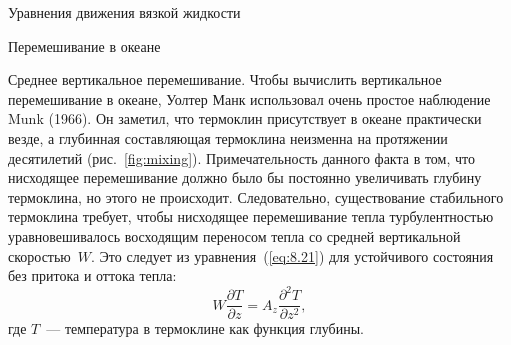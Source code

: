 \begin{chapter}{Уравнения движения вязкой жидкости}
\begin{section}{Перемешивание в океане}
\begin{paragraph}{Среднее вертикальное перемешивание.}
Чтобы вычислить вертикальное перемешивание в океане, Уолтер Манк использовал 
очень простое наблюдение Munk (1966). Он заметил, что 
термоклин присутствует в океане практически везде, 
а глубинная составляющая термоклина неизменна на протяжении
десятилетий (рис.~\ref{fig:mixing}). Примечательность данного факта в том, что
нисходящее перемешивание должно было бы постоянно увеличивать глубину 
термоклина, но этого не происходит. Следовательно, существование стабильного 
термоклина требует, чтобы нисходящее перемешивание тепла 
турбулентностью уравновешивалось восходящим
переносом тепла со средней вертикальной
скоростью~$W$. Это следует из уравнения~(\ref{eq:8.21}) для устойчивого 
состояния без притока и оттока тепла:
\begin{equation}
 W \frac{\partial T}{\partial z} = A_z \frac{\partial^2 T}{\partial z^2},
\end{equation}
где $T$~--- температура в термоклине как функция глубины.
%


\end{paragraph}
\end{section}
\end{chapter}
